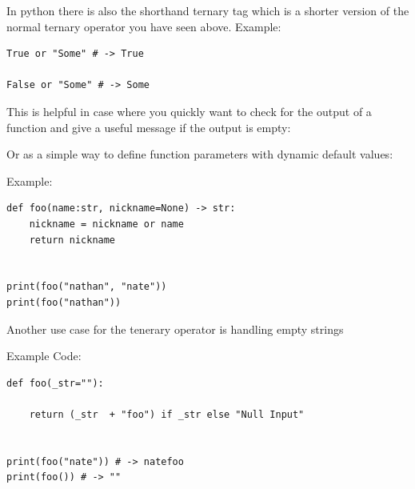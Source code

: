 \documentclass{report}
\begin{document}
    \bigbreak \noindent 
    In python there is also the shorthand ternary tag which is a shorter version of the normal ternary operator you have seen above.
    \bigbreak \noindent 
    Example:
    \begin{verbatim}
True or "Some" # -> True

False or "Some" # -> Some
    \end{verbatim}
    This is helpful in case where you quickly want to check for the output of a function and give a useful message if the output is empty:

    \bigbreak \noindent 
    Or as a simple way to define function parameters with dynamic default values:

    \bigbreak \noindent 
    Example:
    \begin{verbatim}
def foo(name:str, nickname=None) -> str:
    nickname = nickname or name
    return nickname


print(foo("nathan", "nate"))
print(foo("nathan"))
    \end{verbatim}

    \bigbreak \noindent 
    Another use case for the tenerary operator is handling empty strings

    \bigbreak \noindent 
    Example Code:
    \begin{verbatim}
def foo(_str=""):

    return (_str  + "foo") if _str else "Null Input"


print(foo("nate")) # -> natefoo
print(foo()) # -> ""
    \end{verbatim}

    \pagebreak \bigbreak \noindent
\end{document}
